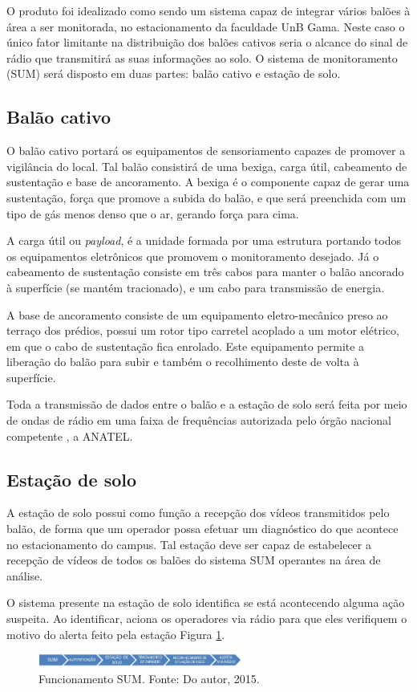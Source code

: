 O produto foi idealizado como sendo um sistema capaz de integrar vários balões à área a ser monitorada,  no estacionamento da faculdade UnB Gama. Neste caso o único fator limitante na distribuição dos balões cativos seria o alcance do sinal de rádio que transmitirá as suas informações ao solo. O sistema de monitoramento (SUM) será disposto em duas partes: balão cativo e estação de solo.

\subsection{Balão cativo}

O balão cativo portará os equipamentos de sensoriamento capazes de promover a vigilância do local. Tal balão  consistirá de uma bexiga, carga útil, cabeamento de sustentação e base de ancoramento. A bexiga é o componente capaz de gerar uma sustentação, força que promove a subida do balão, e que será preenchida com um tipo de gás menos denso que o ar, gerando força para cima.

A carga útil ou \textit{payload}, é a unidade formada por uma estrutura portando todos  os equipamentos eletrônicos que promovem o monitoramento desejado. Já o cabeamento de sustentação consiste em  três cabos para manter o balão ancorado à superfície (se mantém tracionado), e um cabo para  transmissão de energia.

A base de ancoramento consiste de um equipamento eletro-mecânico preso ao terraço dos prédios, possui um rotor tipo carretel acoplado a um motor elétrico, em que o cabo de sustentação fica enrolado. Este equipamento permite a liberação do balão para subir e também o recolhimento deste de volta à superfície.

Toda a transmissão de dados entre o balão e a estação de solo será feita por meio de ondas de rádio em uma faixa de frequências autorizada pelo órgão nacional competente , a ANATEL.

\subsection{Estação de solo}

A estação de solo possui como função a recepção dos vídeos transmitidos pelo balão, de forma que um operador possa efetuar um diagnóstico do que acontece no estacionamento do campus. Tal estação deve ser capaz de estabelecer a recepção de vídeos de todos os balões do sistema SUM operantes na área de análise.

O sistema presente na estação de solo identifica se  está acontecendo alguma ação suspeita. Ao identificar,  aciona os operadores via rádio  para que eles verifiquem o motivo do alerta feito pela estação Figura \ref{img:processo}.


\begin{figure}[H]
	\centering
	\includegraphics[width=0.6\textwidth]{figuras/processo}
	\caption{Funcionamento SUM. Fonte: Do autor, 2015.}
	\label{img:processo}
\end{figure}
